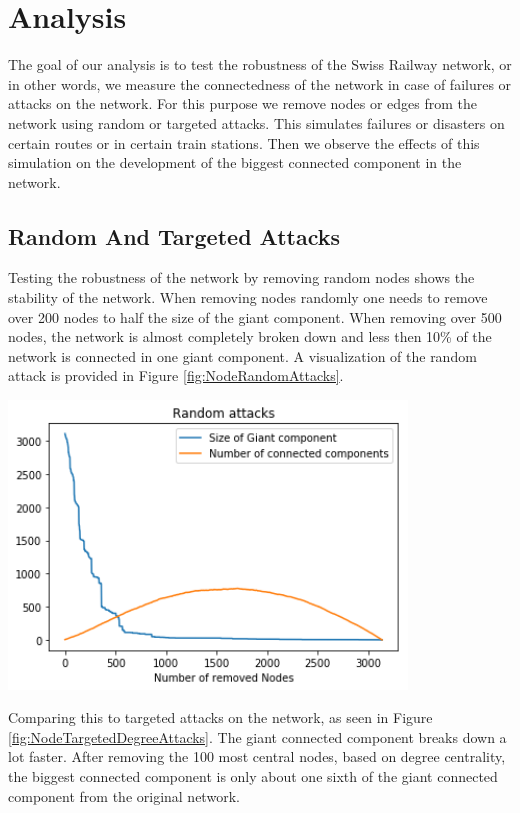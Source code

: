 \documentclass{Resources/netsci-project}
\begin{document}
\section{Analysis}
The goal of our analysis is to test the robustness of the Swiss Railway network, or in other words, we measure the connectedness of the network in case of failures or attacks on the network. For this purpose we remove nodes or edges from the network using random or targeted attacks. This simulates failures or disasters on certain routes or in certain train stations. Then we observe the effects of this simulation on the development of the biggest connected component in the network.  

\subsection{Random And Targeted Attacks}
Testing the robustness of the network by removing random nodes shows the stability of the network. When removing nodes randomly one needs to remove over 200 nodes to half the size of the giant component. When removing over 500 nodes, the network is almost completely broken down and less then 10\% of the network is connected in one giant component. A visualization of the random attack is provided in Figure \ref{fig:NodeRandomAttacks}.

\begin{center}
    \centering
    \includegraphics[width=300pt]{Resources/node_random_attacks}
    \label{fig:NodeRandomAttacks}
\end{center}
\noindent
Comparing this to targeted attacks on the network, as seen in Figure \ref{fig:NodeTargetedDegreeAttacks}. The giant connected component breaks down a lot faster. After removing the 100 most central nodes, based on degree centrality, the biggest connected component is only about one sixth of the giant connected component from the original network.
\end{document}
